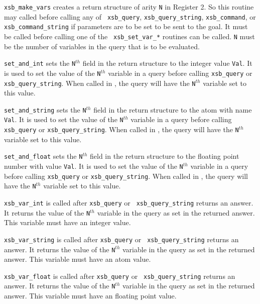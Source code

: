 \begin{description}
 
    {\tt xsb\_make\_vars} creates a return structure of arity {\tt N}
in Register 2.  So this routine may called before calling any of {\tt
xsb\_query}, {\tt xsb\_query\_string}, {\tt xsb\_command}, or {\tt
xsb\_command\_string} if parameters are to be set to be sent to the
goal.  It must be called before calling one of the {\tt
xsb\_set\_var\_*} routines can be called. {\tt N} must be the number
of variables in the query that is to be evaluated.

    {\tt set\_and\_int} sets the {\tt N}$^{th}$ field in the return
structure to the integer value {\tt Val}.  It is used to set the value of
the {\tt N}$^{th}$ variable in a query before calling {\tt xsb\_query} or
{\tt xsb\_query\_string}.  When called in \ourprolog, the query will
have the {\tt N}$^{th}$ variable set to this value.

    {\tt set\_and\_string} sets the {\tt N}$^{th}$ field in the return
structure to the atom with name {\tt Val}.  It is used to set the
value of the {\tt N}$^{th}$ variable in a query before calling {\tt
xsb\_query} or {\tt xsb\_query\_string}.  When called in \ourprolog,
the query will have the {\tt N}$^{th}$ variable set to this value.

    {\tt set\_and\_float} sets the {\tt N}$^{th}$ field in the return
structure to the floating point number with value {\tt Val}.  It is
used to set the value of the {\tt N}$^{th}$ variable in a query before
calling {\tt xsb\_query} or {\tt xsb\_query\_string}.  When called in
\ourprolog, the query will have the {\tt N}$^{th}$ variable set to this
value.

 
    {\tt xsb\_var\_int} is called after {\tt xsb\_query} or {\tt
xsb\_query\_string} returns an answer.  It returns the value of the
{\tt N}$^{th}$ variable in the query as set in the returned answer.
This variable must have an integer value.

 
    {\tt xsb\_var\_string} is called after {\tt xsb\_query} or {\tt
xsb\_query\_string} returns an answer.  It returns the value of the
{\tt N}$^{th}$ variable in the query as set in the returned answer.
This variable must have an atom value.

 
    {\tt xsb\_var\_float} is called after {\tt xsb\_query} or {\tt
xsb\_query\_string} returns an answer.  It returns the value of the
{\tt N}$^{th}$ variable in the query as set in the returned answer.
This variable must have an floating point value.


\end{description}


